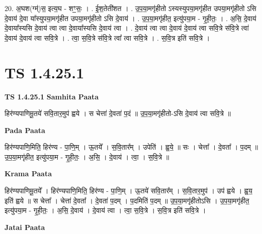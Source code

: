 \documentclass[17pt]{extarticle}
\begin{document}
20. अ॒घश(ग्म्॑)स॒ इत्य॒घ - शꣳ॒॒सः॒ । . ई॒श॒तेती॑शत । . उ॒प॒या॒मगृ॑हीतो ऽस्यस्युपया॒मगृ॑हीत उपया॒मगृ॑हीतो ऽसि दे॒वाय॑ दे॒वा या᳚स्युपया॒मगृ॑हीत उपया॒मगृ॑हीतो ऽसि दे॒वाय॑ । . उ॒प॒या॒मगृ॑हीत॒ इत्यु॑पया॒म - गृ॒ही॒तः॒ । . अ॒सि॒ दे॒वाय॑ दे॒वाया᳚स्यसि दे॒वाय॑ त्वा त्वा दे॒वाया᳚स्यसि दे॒वाय॑ त्वा । . दे॒वाय॑ त्वा त्वा दे॒वाय॑ दे॒वाय॑ त्वा सवि॒त्रे स॑वि॒त्रे त्वा॑ दे॒वाय॑ दे॒वाय॑ त्वा सवि॒त्रे । . त्वा॒ स॒वि॒त्रे स॑वि॒त्रे त्वा᳚ त्वा सवि॒त्रे । . स॒वि॒त्र इति॑ सवि॒त्रे । \newline
\pagebreak
{}

\section{ TS 1.4.25.1 }

\textbf{TS 1.4.25.1 } \newline
\textbf{Samhita Paata} \newline

हिर॑ण्यपाणिमू॒तये॑ सवि॒तार॒मुप॑ ह्वये । स चेत्ता॑ दे॒वता॑ प॒दं ॥ उ॒प॒या॒मगृ॑हीतो-ऽसि दे॒वाय॑ त्वा सवि॒त्रे ॥ \newline

\textbf{Pada Paata} \newline

हिर॑ण्यपाणि॒मिति॒ हिर॑ण्य - पा॒णि॒म् । ऊ॒तये᳚ । स॒वि॒तार᳚म् । उपेति॑ । ह्व॒ये॒ ॥ सः । चेत्ता᳚ । दे॒वता᳚ । प॒दम् ॥ उ॒प॒या॒मगृ॑हीत॒ इत्यु॑पया॒म - गृ॒ही॒तः॒ । अ॒सि॒ । दे॒वाय॑ । त्वा॒ । स॒वि॒त्रे ॥  \newline


\textbf{Krama Paata} \newline

हिर॑ण्यपाणिमू॒तये᳚ । हिर॑ण्यपाणि॒मिति॒ हिर॑ण्य - पा॒णि॒म् । ऊ॒तये॑ सवि॒तार᳚म् । स॒वि॒तार॒मुप॑ । उप॑ ह्वये । ह्व॒य॒ इति॑ ह्वये ॥ स चेत्ता᳚ । चेत्ता॑ दे॒वता᳚ । दे॒वता॑ प॒दम् । प॒दमिति॑ प॒दम् ॥ उ॒प॒या॒मगृ॑हीतोऽसि । उ॒प॒या॒मगृ॑हीत॒ इत्यु॑पया॒म - गृ॒ही॒तः॒ । अ॒सि॒ दे॒वाय॑ । दे॒वाय॑ त्वा । त्वा॒ स॒वि॒त्रे । स॒वि॒त्र इति॑ सवि॒त्रे । \newline

\textbf{Jatai Paata} \newline
\end{document}
